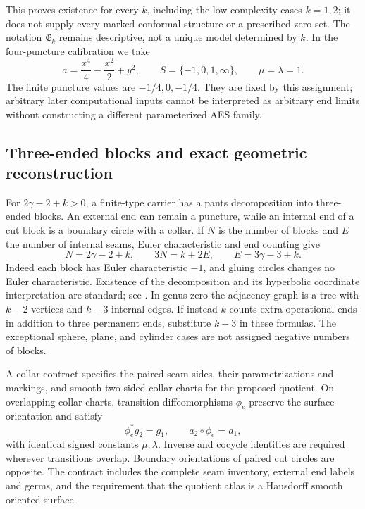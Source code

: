 This proves existence for every $k$, including the low-complexity cases
$k=1,2$; it does not supply every marked conformal structure or a prescribed
zero set.  The notation $\mathfrak E_k$ remains descriptive, not a unique
model determined by $k$.  In the four-puncture calibration we take
\begin{equation}
 a=\frac{x^4}{4}-\frac{x^2}{2}+y^2,
 \qquad S=\{-1,0,1,\infty\},\qquad \mu=\lambda=1.
 \label{eq:p0-k4-calibration}
\end{equation}
The finite puncture values are $-1/4,0,-1/4$.  They are fixed by this assignment;
arbitrary later computational inputs cannot be interpreted as arbitrary end
limits without constructing a different parameterized AES family.

\subsection{Three-ended blocks and exact geometric reconstruction}

For $2\gamma-2+k>0$, a finite-type carrier has a pants decomposition into
three-ended blocks.  An external end can remain a puncture, while an internal
end of a cut block is a boundary circle with a collar.  If $N$ is the number
of blocks and $E$ the number of internal seams, Euler characteristic and end
counting give
\begin{equation}
 N=2\gamma-2+k,\qquad 3N=k+2E,\qquad E=3\gamma-3+k.
 \label{eq:p0-pants-counts}
\end{equation}
Indeed each block has Euler characteristic $-1$, and gluing circles changes
no Euler characteristic.  Existence of the decomposition and its hyperbolic
coordinate interpretation are standard; see \cite[\S2]{Wolpert2003Completion}.
In genus zero the adjacency graph is a tree with $k-2$ vertices and $k-3$
internal edges.  If instead $k$ counts extra operational ends in addition to
three permanent ends, substitute $k+3$ in these formulas.  The exceptional
sphere, plane, and cylinder cases are not assigned negative numbers of blocks.

\begin{definition}
\label{def:p0-collar-contract}
A collar contract specifies the paired seam sides, their parametrizations and
markings, and smooth two-sided collar charts for the proposed quotient.
On overlapping collar charts, transition diffeomorphisms $\phi_e$ preserve the
surface orientation and satisfy
\begin{equation}
 \phi_e^*g_2=g_1,\qquad a_2\circ\phi_e=a_1,
 \label{eq:p0-collar-matching}
\end{equation}
with identical signed constants $\mu,\lambda$.  Inverse and cocycle identities
are required wherever transitions overlap.  Boundary orientations of paired
cut circles are opposite.  The contract includes the complete seam inventory,
external end labels and germs, and the requirement that the quotient atlas is
a Hausdorff smooth oriented surface.
\end{definition}

